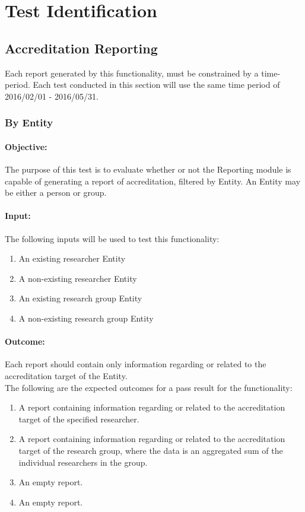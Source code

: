 \section{Test Identification}

\subsection{Accreditation Reporting}
Each report generated by this functionality, must be constrained by a time-period. Each test conducted in this section will use the same time period of 2016/02/01 - 2016/05/31.

\subsubsection{By Entity} \label{ti_ar_entity}
\paragraph{Objective:}
The purpose of this test is to evaluate whether or not the Reporting module is capable of 
generating a report of accreditation, filtered by Entity. An Entity may be either a 
person or group.
\paragraph{Input:}
The following inputs will be used to test this functionality:
\begin{enumerate}
	\item An existing researcher Entity
	\item A non-existing researcher Entity
	\item An existing research group Entity
	\item A non-existing research group Entity
\end{enumerate}
\paragraph{Outcome:}
Each report should contain only information regarding or related to the accreditation target of the Entity. \\
The following are the expected outcomes for a pass result for the functionality:
\begin{enumerate}
	\item A report containing information regarding or related to the accreditation target of the specified researcher.
	\item A report containing information regarding or related to the accreditation target of the research group, where the data is an aggregated sum of the individual researchers in the group.
	\item An empty report.
	\item An empty report.
\end{enumerate}

